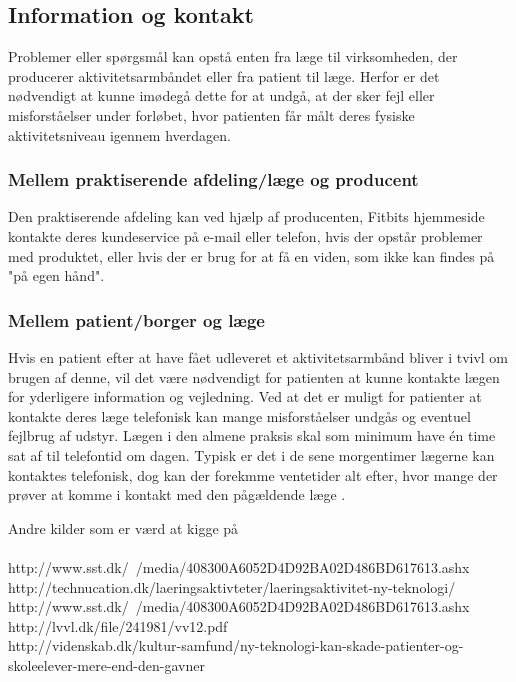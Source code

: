\subsection{Information og kontakt}
Problemer eller spørgsmål kan opstå enten fra læge til virksomheden, der producerer aktivitetsarmbåndet eller fra patient til læge. Herfor er det nødvendigt at kunne imødegå dette for at undgå, at der sker fejl eller misforståelser under forløbet, hvor patienten får målt deres fysiske aktivitetsniveau igennem hverdagen. 

\subsubsection{Mellem praktiserende afdeling/læge og producent}
Den praktiserende afdeling kan ved hjælp af producenten, Fitbits hjemmeside kontakte deres kundeservice på e-mail eller telefon, hvis der opstår problemer med produktet, eller hvis der er brug for at få en viden, som ikke kan findes på "på egen hånd". 

\subsubsection{Mellem patient/borger og læge}
Hvis en patient efter at have fået udleveret et aktivitetsarmbånd bliver i tvivl om brugen af denne, vil det være nødvendigt for patienten at kunne kontakte lægen for yderligere information og vejledning. Ved at det er muligt for patienter at kontakte deres læge telefonisk kan mange misforståelser undgås og eventuel fejlbrug af udstyr. Lægen i den almene praksis skal som minimum have én time sat af til telefontid om dagen. Typisk er det i de sene morgentimer lægerne kan kontaktes telefonisk, dog kan der forekmme ventetider alt efter, hvor mange der prøver at komme i kontakt med den pågældende læge \citep{vedsted2005}. 


Andre kilder som er værd at kigge på \\\\

http://www.sst.dk/~/media/408300A6052D4D92BA02D486BD617613.ashx \\
http://technucation.dk/laeringsaktivteter/laeringsaktivitet-ny-teknologi/ \\
http://www.sst.dk/~/media/408300A6052D4D92BA02D486BD617613.ashx \\
http://lvvl.dk/file/241981/vv12.pdf \\

http://videnskab.dk/kultur-samfund/ny-teknologi-kan-skade-patienter-og-skoleelever-mere-end-den-gavner

